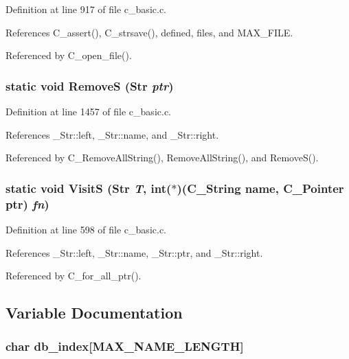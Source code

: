 Definition at line 917 of file c\_\-basic.c.

References C\_\-assert(), C\_\-strsave(), defined, files, and MAX\_\-FILE.

Referenced by C\_\-open\_\-file().
\subsubsection{\setlength{\rightskip}{0pt plus 5cm}static void Remove\-S (\bf{Str} {\em ptr})\hspace{0.3cm}{\tt  [static]}}\label{c__basic_8c_6492703d21c90d6a67726c88c36f0b6c}




Definition at line 1457 of file c\_\-basic.c.

References \_\-Str::left, \_\-Str::name, and \_\-Str::right.

Referenced by C\_\-Remove\-All\-String(), Remove\-All\-String(), and Remove\-S().
\subsubsection{\setlength{\rightskip}{0pt plus 5cm}static void Visit\-S (\bf{Str} {\em T}, int($\ast$)(\bf{C\_\-String} \bf{name}, \bf{C\_\-Pointer} ptr) {\em fn})\hspace{0.3cm}{\tt  [static]}}\label{c__basic_8c_fcb605d2a5fc98e5ebd19ebcb64897e6}




Definition at line 598 of file c\_\-basic.c.

References \_\-Str::left, \_\-Str::name, \_\-Str::ptr, and \_\-Str::right.

Referenced by C\_\-for\_\-all\_\-ptr().

\subsection{Variable Documentation}
\subsubsection{\setlength{\rightskip}{0pt plus 5cm}char \bf{db\_\-index}[MAX\_\-NAME\_\-LENGTH]\hspace{0.3cm}{\tt  [static]}}\label{c__basic_8c_f6ab392917522c7a05ce671660743080}




